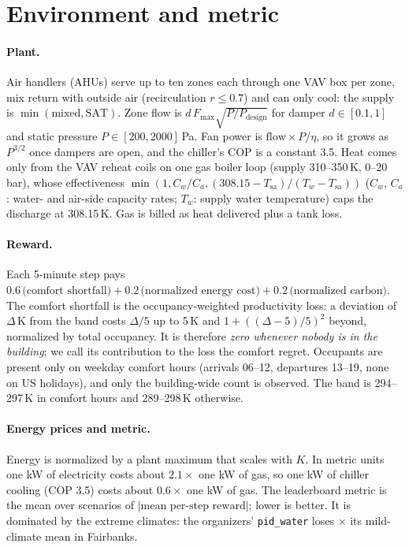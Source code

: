 \documentclass{article}
\begin{document}
\section{Environment and metric}
\label{sec:env}

\paragraph{Plant.} Air handlers (AHUs) serve up to ten zones each through one VAV box per zone, mix return with outside air (recirculation $r\le 0.7$) and can only cool: the supply is $\min(\text{mixed}, \text{SAT})$. Zone flow is $d\,F_{\max}\sqrt{P/P_{\text{design}}}$ for damper $d\in[0.1,1]$ and static pressure $P\in[200,2000]$\,Pa. Fan power is $\text{flow}\times P/\eta$, so it grows as $P^{3/2}$ once dampers are open, and the chiller's COP is a constant 3.5. Heat comes only from the VAV reheat coils on one gas boiler loop (supply 310--350\,K, 0--20\,bar), whose effectiveness $\min(1, C_w/C_a, (308.15-T_{\text{sa}})/(T_w - T_{\text{sa}}))$ ($C_w$, $C_a$: water- and air-side capacity rates; $T_w$: supply water temperature) caps the discharge at 308.15\,K. Gas is billed as heat delivered plus a tank loss.

\paragraph{Reward.} Each 5-minute step pays $0.6\,\text{(comfort shortfall)} + 0.2\,\text{(normalized energy cost)} + 0.2\,\text{(normalized carbon)}$. The comfort shortfall is the occupancy-weighted productivity loss: a deviation of $\Delta$\,K from the band costs $\Delta/5$ up to 5\,K and $1+((\Delta-5)/5)^2$ beyond, normalized by total occupancy. It is therefore \emph{zero whenever nobody is in the building}; we call its contribution to the loss the comfort regret. Occupants are present only on weekday comfort hours (arrivals 06--12, departures 13--19, none on US holidays), and only the building-wide count is observed. The band is 294--297\,K in comfort hours and 289--298\,K otherwise.

\paragraph{Energy prices and metric.} Energy is normalized by a plant maximum that scales with $K$. In metric units one kW of electricity costs about $2.1\times$ one kW of gas, so one kW of chiller cooling (COP 3.5) costs about $0.6\times$ one kW of gas. The leaderboard metric is the mean over scenarios of $|\text{mean per-step reward}|$; lower is better. It is dominated by the extreme climates: the organizers' \texttt{pid\_water} loses \ExtremeRatioFairbanks$\times$ its mild-climate mean in Fairbanks.
\end{document}

